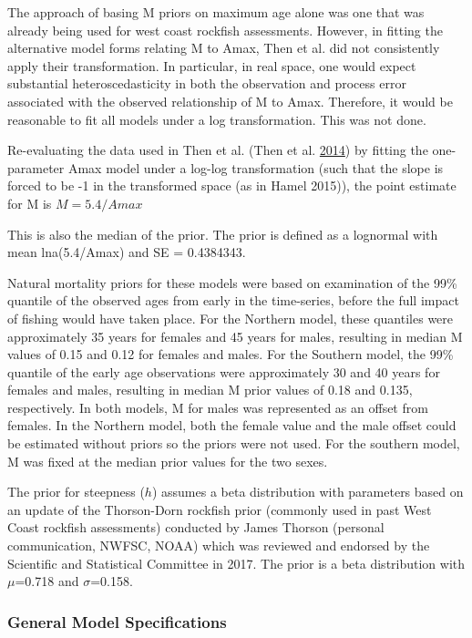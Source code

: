\documentclass[12pt,]{article}
\begin{document}
The approach of basing M priors on maximum age alone was one that was
already being used for west coast rockfish assessments. However, in
fitting the alternative model forms relating M to Amax, Then et al. did
not consistently apply their transformation. In particular, in real
space, one would expect substantial heteroscedasticity in both the
observation and process error associated with the observed relationship
of M to Amax. Therefore, it would be reasonable to fit all models under
a log transformation. This was not done.

Re-evaluating the data used in Then et al. (Then et al.
\protect\hyperlink{ref-Then2014}{2014}) by fitting the one-parameter
Amax model under a log-log transformation (such that the slope is forced
to be -1 in the transformed space (as in Hamel 2015)), the point
estimate for M is \(M=5.4/Amax\)

This is also the median of the prior. The prior is defined as a
lognormal with mean lna(5.4/Amax) and SE = 0.4384343.

Natural mortality priors for these models were based on examination of
the 99\% quantile of the observed ages from early in the time-series,
before the full impact of fishing would have taken place. For the
Northern model, these quantiles were approximately 35 years for females
and 45 years for males, resulting in median M values of 0.15 and 0.12
for females and males. For the Southern model, the 99\% quantile of the
early age observations were approximately 30 and 40 years for females
and males, resulting in median M prior values of 0.18 and 0.135,
respectively. In both models, M for males was represented as an offset
from females. In the Northern model, both the female value and the male
offset could be estimated without priors so the priors were not used.
For the southern model, M was fixed at the median prior values for the
two sexes.

The prior for steepness (\(h\)) assumes a beta distribution with
parameters based on an update of the Thorson-Dorn rockfish prior
(commonly used in past West Coast rockfish assessments) conducted by
James Thorson (personal communication, NWFSC, NOAA) which was reviewed
and endorsed by the Scientific and Statistical Committee in 2017. The
prior is a beta distribution with \(\mu\)=0.718 and \(\sigma\)=0.158.

\subsubsection{General Model
Specifications}\label{general-model-specifications}
\end{document}

